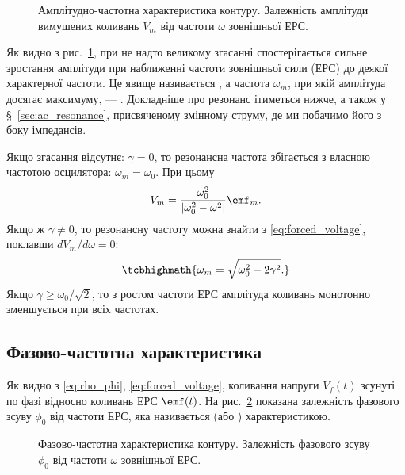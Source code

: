 \begin{figure}[h!]
	\centering
	\caption{Амплітудно-частотна характеристика контуру. Залежність амплітуди вимушених коливань $V_m$ від частоти $\omega$ зовнішньої ЕРС.}
	\label{tikz:amplitude_response}
\end{figure}

Як видно з рис.~\ref{tikz:amplitude_response}, при не надто великому згасанні спостерігається сильне зростання амплітуди при наближенні частоти
зовнішньої сили (ЕРС) до деякої характерної частоти. Це явище
називається , а частота $\omega_m$, при якій амплітуда досягає
максимуму, --- . Докладніше про резонанс ітиметься нижче, а також у \S~\ref{sec:ac_resonance}, присвяченому змінному струму, де ми побачимо його з боку імпедансів.

Якщо згасання відсутнє: $\gamma = 0$, то резонансна частота збігається з власною частотою осцилятора: $\omega_m = \omega_0$. При цьому
\begin{equation}\label{eq:resonance_no_damping}
	V_m = \frac{\omega_0^2}{\left|\omega_0^2 - \omega^2\right|}\emf_m.
\end{equation}
Якщо ж $\gamma \neq 0$, то резонансну частоту можна знайти з \eqref{eq:forced_voltage}, поклавши
$dV_m/d\omega = 0$:
\begin{equation}\label{eq:resonance_frequency}
	\tcbhighmath{
		\omega_m = \sqrt{\omega_0^2 - 2\gamma^2}.
	}
\end{equation}
Якщо $\gamma \geqslant \omega_0/\sqrt{2}$, то з ростом частоти ЕРС амплітуда коливань монотонно зменшується при всіх частотах.

\subsection*{Фазово-частотна характеристика}

Як видно з \eqref{eq:rho_phi}, \eqref{eq:forced_voltage}, коливання напруги $V_f(t)$ зсунуті по фазі відносно коливань ЕРС $\emf(t)$. На рис.~\ref{tikz:phase_response} показана залежність фазового зсуву $\phi_0$ від частоти ЕРС, яка називається  (або ) характеристикою.

\begin{figure}[h!]
	\centering
	\caption{Фазово-частотна характеристика контуру. Залежність фазового зсуву $\phi_0$ від частоти $\omega$ зовнішньої ЕРС.}
	\label{tikz:phase_response}
\end{figure}

